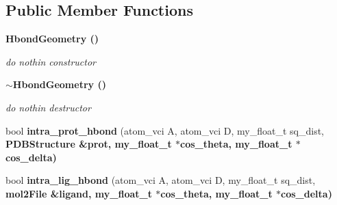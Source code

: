 \subsection*{Public Member Functions}
\begin{CompactItemize}
\item 
\bf{Hbond\-Geometry} ()\label{classASCbase_1_1HbondGeometry_f6af480ef52e15eb1ebd8adde6d525d7}

\begin{CompactList}\small\item\em do nothin constructor \item\end{CompactList}\item 
\bf{$\sim$Hbond\-Geometry} ()\label{classASCbase_1_1HbondGeometry_9c9e35e681954f55d64548c7f8bfd086}

\begin{CompactList}\small\item\em do nothin destructor \item\end{CompactList}\item 
bool \textbf{intra\_\-prot\_\-hbond} (atom\_\-vci A, atom\_\-vci D, my\_\-float\_\-t sq\_\-dist, \bf{PDBStructure} \&prot, my\_\-float\_\-t $\ast$cos\_\-theta, my\_\-float\_\-t $\ast$cos\_\-delta)\label{classASCbase_1_1HbondGeometry_bce57004079a80856d9c5078b3b487d7}

\item 
bool \textbf{intra\_\-lig\_\-hbond} (atom\_\-vci A, atom\_\-vci D, my\_\-float\_\-t sq\_\-dist, \bf{mol2File} \&ligand, my\_\-float\_\-t $\ast$cos\_\-theta, my\_\-float\_\-t $\ast$cos\_\-delta)\label{classASCbase_1_1HbondGeometry_ba541a4f7b2f58f99ef30fb933e5dd64}


\end{CompactItemize}
